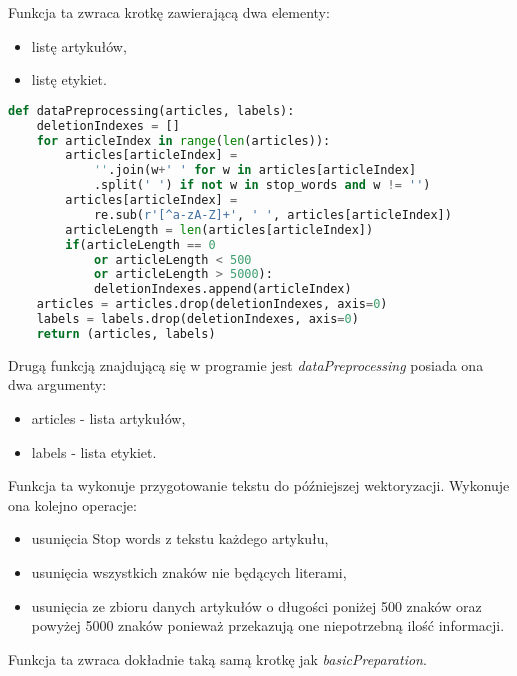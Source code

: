 Funkcja ta zwraca krotkę zawierającą dwa elementy:
\begin{itemize}
    \item listę artykułów,
    \item listę etykiet.
\end{itemize} 

\begin{lstlisting}[language=Python, caption={Funkcja przygotowywująca dane tekstowe}, captionpos=b, frame=single]
def dataPreprocessing(articles, labels):
    deletionIndexes = []
    for articleIndex in range(len(articles)):
        articles[articleIndex] = 
            ''.join(w+' ' for w in articles[articleIndex]
            .split(' ') if not w in stop_words and w != '')  
        articles[articleIndex] = 
            re.sub(r'[^a-zA-Z]+', ' ', articles[articleIndex])
        articleLength = len(articles[articleIndex])
        if(articleLength == 0 
            or articleLength < 500 
            or articleLength > 5000):
            deletionIndexes.append(articleIndex) 
    articles = articles.drop(deletionIndexes, axis=0)
    labels = labels.drop(deletionIndexes, axis=0)
    return (articles, labels)

\end{lstlisting}

Drugą funkcją znajdującą się w programie jest \textit{dataPreprocessing} posiada 
ona dwa argumenty:
\begin{itemize}
    \item articles - lista artykułów,
    \item labels - lista etykiet.
\end{itemize}
Funkcja ta wykonuje przygotowanie tekstu do późniejszej wektoryzacji. Wykonuje ona 
kolejno operacje:
\begin{itemize}
    \item usunięcia Stop words z tekstu każdego artykułu,
    \item usunięcia wszystkich znaków nie będących literami,
    \item usunięcia ze zbioru danych artykułów o długości poniżej 500 znaków oraz powyżej 5000 znaków
    ponieważ przekazują one niepotrzebną ilość informacji.
\end{itemize}
Funkcja ta zwraca dokładnie taką samą krotkę jak \textit{basicPreparation}.


